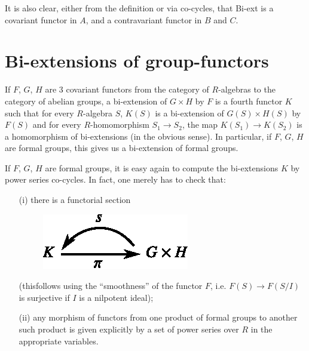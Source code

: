 It is also clear, either from the definition or via co-cycles, that Bi-ext is a covariant functor in $A$, and a contravariant functor in $B$ and $C$.

\section{Bi-extensions of group-functors}\label{art15-sec3}

\begin{defi*}
If $F$, $G$, $H$ are $3$ covariant functors from the category of $R$-algebras to the category of abelian groups, a bi-extension of $G\times H$ by $F$ is a fourth functor $K$ such that for every $R$-algebra $S$, $K(S)$ is a bi-extension of $G(S)\times H(S)$ by $F(S)$ and for every $R$-homomorphism $S_{1}\to S_{2}$, the map $K(S_{1})\to K(S_{2})$ is a homomorphism of bi-extensions (in the obvious sense). In particular, if $F$, $G$, $H$ are formal groups, this gives us a bi-extension of formal groups.
\end{defi*}

If $F$, $G$, $H$ are formal groups, it is easy again to compute the bi-extensions $K$ by power series co-cycles. In fact, one merely has to check that:
\begin{itemize}
\item[(i)] there is a functorial section
\begin{figure}[H]
\centering
\includegraphics{figures/fig2.eps}
\end{figure}
(this\pageoriginale follows using the ``smoothness'' of the functor $F$, i.e. $F(S)\to F(S/I)$ is surjective if $I$ is a nilpotent ideal);

\item[(ii)] any morphism of functors from one product of formal groups to another such product is given explicitly by a set of power series over $R$ in the appropriate variables.
\end{itemize}

